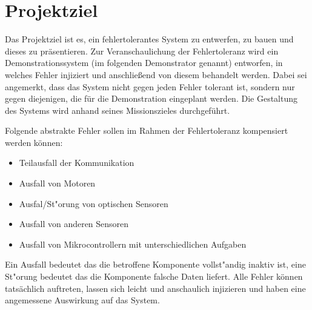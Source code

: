\section{Projektziel}
\label{Projektziel}
Das Projektziel ist es, ein fehlertolerantes System zu entwerfen, zu bauen und dieses zu präsentieren.
Zur Veranschaulichung der Fehlertoleranz wird ein Demonstrationssystem (im folgenden Demonstrator genannt) entworfen, in welches Fehler injiziert und anschließend von diesem behandelt werden.
Dabei sei angemerkt, dass das System nicht gegen jeden Fehler tolerant ist, sondern nur gegen diejenigen, die für die Demonstration eingeplant werden.
Die Gestaltung des Systems wird anhand seines Missionszieles durchgeführt.

Folgende abstrakte Fehler sollen im Rahmen der Fehlertoleranz kompensiert werden können:

\begin{itemize}
	\item Teilausfall der Kommunikation
	\item Ausfall von Motoren
	\item Ausfal/St"orung von optischen Sensoren
	\item Ausfall von anderen Sensoren
	\item Ausfall von Mikrocontrollern mit unterschiedlichen Aufgaben
\end{itemize}



Ein Ausfall bedeutet das die betroffene Komponente vollst"andig inaktiv ist, eine St"orung bedeutet das die Komponente falsche Daten liefert.  
Alle Fehler können tatsächlich auftreten, lassen sich leicht und anschaulich injizieren und haben eine angemessene Auswirkung auf das System.